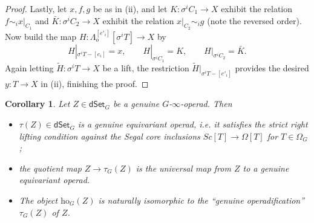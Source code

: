 \documentclass[a4paper,10pt
,draft
]{article}%
\numberwithin{equation}{section}
\numberwithin{figure}{section}
\newtheorem{corollary}[equation]{Corollary}%
\theoremstyle{definition} %
\newcommand{\1}{\ensuremath{\mathbbm 1}}%
\begin{document}
\begin{proof}
Lastly, let $x,f,g$ be as in (ii), 
and let
$K \colon \sigma^i C_1 \to X$ exhibit the relation
$f \sim_i x|_{C_1}$
and 
$ \bar{K} \colon \sigma^i C_2 \to X$
exhibit the relation
$x|_{C_2} \sim_i g$ (note the reversed order).
Now build the map
$H \colon \Lambda_o^{[e'_i]}[\sigma^i T] \to X$ by
\[
	H|_{\sigma^i T - [e_i]} = x,
\qquad
	H|_{\sigma^i C_1} = K,
\qquad
	H|_{\sigma^i C_2} = \bar{K}.
\]
Again letting 
$\widetilde{H} \colon \sigma^i T \to X$ be a lift,
the restriction 
$\widetilde{H}|_{\sigma^i T - [e'_i]}$
provides the desired $y \colon T \to X$ in (ii),
finishing the proof.
\end{proof}

\begin{corollary}\label{HOOPUNIV COR}
Let $Z \in \mathsf{dSet}_G$ be a genuine $G$-$\infty$-operad. Then
	\begin{itemize}
	\item[(a)] $\tau(Z) \in \mathsf{dSet}_G$ is a genuine equivariant operad, i.e. it satisfies the strict right lifting condition against the Segal core inclusions
	$Sc[T] \to \Omega[T]$ for $T \in \Omega_G$;
	\item[(b)] the quotient map
              $Z \to \tau_G(Z)$ is the universal map from $Z$ to a genuine equivariant operad.
        \item[(c)] The object $\mathrm{ho}_G(Z)$ is naturally isomorphic to the ``genuine operadification'' $\tau_G(Z)$ of $Z$.
      	\end{itemize}
\end{corollary}
\end{document}
